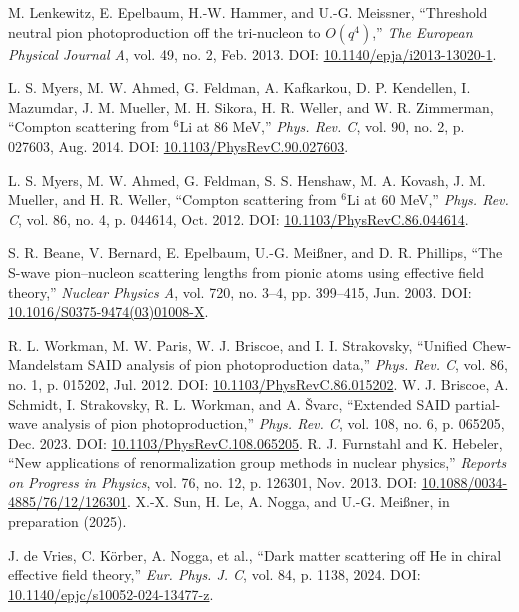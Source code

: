 \documentclass[a4paper,11pt]{article}
\begin{document}
\begin{thebibliography}{99}
  M. Lenkewitz, E. Epelbaum, H.-W. Hammer, and U.-G. Meissner,
  ``Threshold neutral pion photoproduction off the tri-nucleon to
  $O(q^4)$,'' \textit{The European Physical Journal A}, vol. 49, no.
  2, Feb. 2013. DOI:
  \href{http://dx.doi.org/10.1140/epja/i2013-13020-1}{10.1140/epja/i2013-13020-1}.

  L. S. Myers, M. W. Ahmed, G. Feldman, A. Kafkarkou, D. P.
  Kendellen, I. Mazumdar, J. M. Mueller, M. H. Sikora, H. R. Weller,
  and W. R. Zimmerman, ``Compton scattering from $^{6}\mathrm{Li}$ at
  86 MeV,'' \textit{Phys. Rev. C}, vol. 90, no. 2, p. 027603, Aug.
  2014. DOI:
  \href{https://link.aps.org/doi/10.1103/PhysRevC.90.027603}{10.1103/PhysRevC.90.027603}.

  L. S. Myers, M. W. Ahmed, G. Feldman, S. S. Henshaw, M. A. Kovash,
  J. M. Mueller, and H. R. Weller, ``Compton scattering from $^{6}$Li
  at 60 MeV,'' \textit{Phys. Rev. C}, vol. 86, no. 4, p. 044614, Oct.
  2012. DOI:
  \href{https://link.aps.org/doi/10.1103/PhysRevC.86.044614}{10.1103/PhysRevC.86.044614}.

  S. R. Beane, V. Bernard, E. Epelbaum, U.-G. Meißner, and D. R.
  Phillips, ``The S-wave pion–nucleon scattering lengths from pionic
  atoms using effective field theory,'' \textit{Nuclear Physics A},
  vol. 720, no. 3–4, pp. 399–415, Jun. 2003. DOI:
  \href{http://dx.doi.org/10.1016/S0375-9474(03)01008-X}{10.1016/S0375-9474(03)01008-X}.

  R. L. Workman, M. W. Paris, W. J. Briscoe, and I. I. Strakovsky,
  ``Unified Chew-Mandelstam SAID analysis of pion photoproduction
  data,'' \textit{Phys. Rev. C}, vol. 86, no. 1, p. 015202, Jul.
  2012. DOI:
  \href{https://link.aps.org/doi/10.1103/PhysRevC.86.015202}{10.1103/PhysRevC.86.015202}.
  W. J. Briscoe, A. Schmidt, I. Strakovsky, R. L. Workman, and A.
  \ifmmode {}\else \v{S}\fi{}varc, ``Extended SAID
  partial-wave analysis of pion photoproduction,'' \textit{Phys. Rev.
  C}, vol. 108, no. 6, p. 065205, Dec. 2023. DOI:
  \href{https://link.aps.org/doi/10.1103/PhysRevC.108.065205}{10.1103/PhysRevC.108.065205}.
  R. J. Furnstahl and K. Hebeler, ``New applications of
  renormalization group methods in nuclear physics,'' \textit{Reports
  on Progress in Physics}, vol. 76, no. 12, p. 126301, Nov. 2013.
  DOI:
  \href{http://dx.doi.org/10.1088/0034-4885/76/12/126301}{10.1088/0034-4885/76/12/126301}.
  X.-X. Sun, H. Le, A. Nogga, and U.-G. Meißner, in preparation (2025).

  J. de Vries, C. Körber, A. Nogga, et al., ``Dark matter scattering
  off He in chiral effective field theory,'' \textit{Eur. Phys. J.
  C}, vol. 84, p. 1138, 2024. DOI:
  \href{https://doi.org/10.1140/epjc/s10052-024-13477-z}{10.1140/epjc/s10052-024-13477-z}.
\end{thebibliography}
\end{document}
